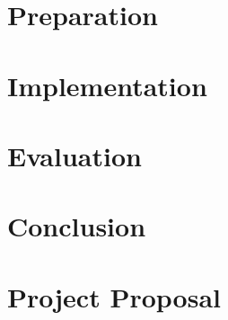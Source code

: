 \documentclass[12pt,a4paper,twoside,openany]{report}
\begin{document}
    \chapter{Preparation}\label{ch:preparation}
    


    \chapter{Implementation}\label{ch:implementation}
    


    \chapter{Evaluation}\label{ch:evaluation}
    


    \chapter{Conclusion}\label{ch:conclusion}
    

%    


    \printbibliography[heading=bibintoc]

    \appendix

    \chapter{Project Proposal}\label{ch:proposal}
    

\end{document}
